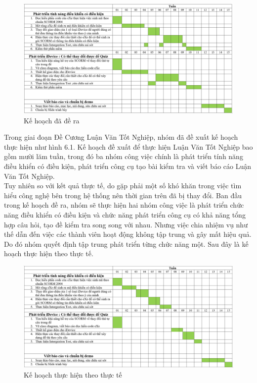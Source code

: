 \begin{center}
	\begin{figure}[htp]
		\begin{center}
			\includegraphics[width=13cm]{Chapter6/Pictures/picture61.png}
		\end{center}
		\caption{Kế hoạch đã đề ra}
		\label{refhinhchuong7xx11}
	\end{figure}
\end{center}

	Trong giai đoạn Đề Cương Luận Văn Tốt Nghiệp, nhóm đã đề xuất kế hoạch thực hiện như hình 6.1. Kế hoạch đề xuất để thực hiện Luận Văn Tốt Nghiệp bao gồm mười lăm tuần, trong đó ba nhóm công việc chính là phát triển tính năng điều khiển có điều kiện, phát triển công cụ tạo bài kiểm tra và viết báo cáo Luận Văn Tốt Nghiệp.\\
	
	Tuy nhiên so với kết quả thực tế, do gặp phải một số khó khăn trong việc tìm hiểu công nghệ bên trong hệ thống nên thời gian trên đã bị thay đổi. Ban đầu trong kế hoạch đề ra, nhóm sẽ thực hiện hai nhóm công việc là phát triển chức năng điều khiển có điều kiện và chức năng phát triển công cụ có khả năng tổng hợp câu hỏi, tạo đề kiểm tra song song với nhau. Nhưng việc chia nhiệm vụ như thế dẫn đến việc các thành viên hoạt động không tập trung và gây mất hiệu quả. Do đó nhóm quyết định tập trung phát triển từng chức năng một. Sau đây là kế hoạch thực hiện theo thực tế.
	
	\begin{center}
		\begin{figure}[htp]
			\begin{center}
				\includegraphics[width=13cm]{Chapter6/Pictures/picture62.png}
			\end{center}
			\caption{Kế hoạch thực hiện theo thực tế}
			\label{refhinhchuong7xx11}
		\end{figure}
	\end{center}
	
